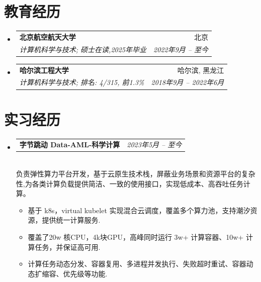 \documentclass[letterpaper,11pt]{article}
\makeatletter
\newcommand{\resumeItem}[2]{
  \item\small{
    \textbf{#1}{ #2 \vspace{-2pt}}
  }
}
\newcommand{\resumeSubheading}[4]{
  \vspace{-1pt}\item
    \begin{tabular*}{0.97\textwidth}{l@{\extracolsep{\fill}}r}
      \textbf{#1} & #2 \\
      \textit{\small#3} & \textit{ #4} \\
    \end{tabular*}\vspace{-5pt}
}
\newcommand{\resumeSubheadingtwo}[2]{
  \vspace{-1pt}\item
    \begin{tabular*}{0.97\textwidth}{l@{\extracolsep{\fill}}r}
      \textbf{#1} & \textit{ #2} \\
    \end{tabular*}\vspace{-5pt}
}
\newcommand{\resumeSubHeadingListStart}{\begin{itemize}[leftmargin=*]}
\newcommand{\resumeSubHeadingListEnd}{\end{itemize}}
\newcommand{\resumeItemListStart}{\vspace{-10pt}\begin{itemize}}
\newcommand{\resumeItemListEnd}{\end{itemize}\vspace{-10pt}}
\makeatother
\begin{document}
\vspace{-21pt}
\section{教育经历}
  \resumeSubHeadingListStart
    \resumeSubheading
      {北京航空航天大学}{北京}
      {计算机科学与技术;  硕士在读,2025年毕业}{2022年9月 -- 至今}
    \resumeSubheading
      {哈尔滨工程大学}{哈尔滨, 黑龙江}
      {计算机科学与技术;  排名: 4/315, 前1.3\%}{2018年9月 -- 2022年6月}
  \resumeSubHeadingListEnd

\section{实习经历}
    \begin{itemize}[leftmargin=*,itemsep=-20pt]
        \resumeSubheadingtwo
            {字节跳动 Data-AML-科学计算}{2023年5月 -- 至今}
            \\[10pt]
            负责弹性算力平台开发，基于云原生技术栈，屏蔽业务场景和资源平台的复杂性,为各类计算负载提供简洁、一致的使用接口，实现低成本、高吞吐任务计算。
            \resumeItemListStart
                 \resumeItem{}
                {基于 k8s，virtual kubelet 实现混合云调度，覆盖多个算力池，支持潮汐资源，提供统一计算服务.}
                \resumeItem{}
                {覆盖了20w 核CPU，4k块GPU，高峰同时运行 3w+ 计算容器、10w+ 计算任务，并保证高可用.}
                \resumeItem{}
                {计算任务动态分发、容器复用、多进程并发执行、失败超时重试、容器动态扩缩容、优先级等功能.}
            \resumeItemListEnd
    \end{itemize}
\end{document}
